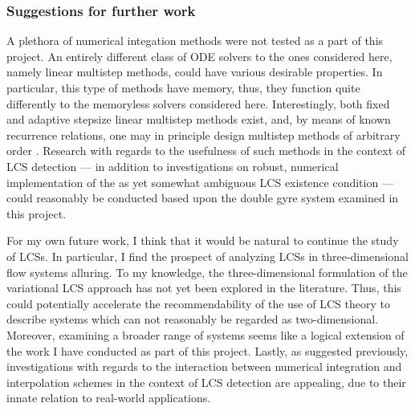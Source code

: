 \subsubsection{Suggestions for further work}

A plethora of numerical integation methods were not tested as a part of this
project. An entirely different class of ODE solvers to the ones considered here,
namely linear multistep methods, could have various desirable properties. In
particular, this type of methods have memory, thus, they function quite
differently to the memoryless solvers considered here. Interestingly, both
fixed and adaptive stepsize linear multistep methods exist, and, by means of
known recurrence relations, one may in principle design multistep methods of
arbitrary order \parencite[chapter III]{hairer1993solving}. Research with
regards to the usefulness of such methods in the context of LCS detection ---
in addition to investigations on robust, numerical implementation of the as
yet somewhat ambiguous LCS existence condition --- could reasonably be conducted
based upon the double gyre system examined in this project.

For my own future work, I think that it would be natural to continue
the study of LCSs. In particular, I find the prospect of analyzing LCSs in
three-dimensional flow systems alluring. To my knowledge, the three-dimensional
formulation of the variational LCS approach has not yet been explored in the
literature. Thus, this could potentially accelerate the recommendability of
the use of LCS theory to describe systems which can not reasonably be regarded
as two-dimensional. Moreover, examining a broader range of systems seems like
a logical extension of the work I have conducted as part of this project.
Lastly, as suggested previously, investigations with regards to the interaction
between numerical integration and interpolation schemes in the context of LCS
detection are appealing, due to their innate relation to real-world
applications.


